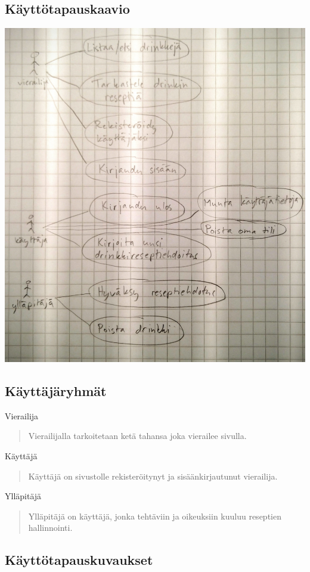 \documentclass[a4paper]{article}
\begin{document}
\subsection{Käyttötapauskaavio}
\includegraphics[width=\textwidth]{usecase-diagram}

\subsection{Käyttäjäryhmät}
Vierailija
\begin{quote}
  Vierailijalla tarkoitetaan ketä tahansa joka vierailee sivulla.
\end{quote}
Käyttäjä
\begin{quote}
  Käyttäjä on sivustolle rekisteröitynyt ja sisäänkirjautunut vierailija.
\end{quote}
Ylläpitäjä
\begin{quote}
  Ylläpitäjä on käyttäjä, jonka tehtäviin ja oikeuksiin kuuluu reseptien hallinnointi.
\end{quote}

\subsection{Käyttötapauskuvaukset}
\end{document}
